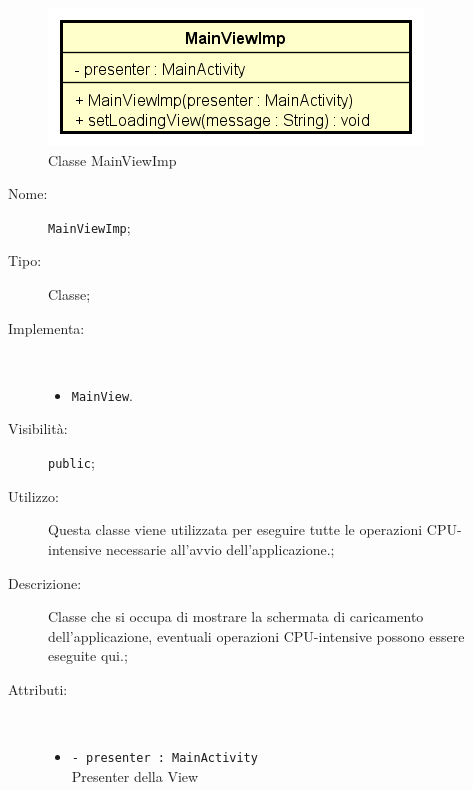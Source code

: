 \documentclass[../DefinizioneDiProdotto.tex]{subfiles}
\begin{document}
    \begin{figure}[H]
        \centering
        \includegraphics{img/MainViewImp.png}
        \caption{Classe MainViewImp}\label{fig:view::MainViewImp} 
    \end{figure}
    \begin{description}
\item[Nome:] \texttt{MainViewImp};
\item[Tipo:] Classe;
\item[Implementa:] \
\begin{itemize}
\item \texttt{MainView}.

\end{itemize}
\item[Visibilità:] \texttt{public};
\item[Utilizzo:] Questa classe viene utilizzata per eseguire tutte le operazioni CPU-intensive necessarie all'avvio dell'applicazione.;
\item[Descrizione:] Classe che si occupa di mostrare la schermata di caricamento dell'applicazione, eventuali operazioni CPU-intensive possono essere eseguite qui.;
\item[Attributi:] \
\begin{itemize}
\item \texttt{- presenter : MainActivity}\\
Presenter della View


\end{itemize}
\end{description}
\end{document}
